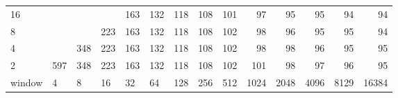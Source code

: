 \begin{table}[h]
{\begin{tabular}{lrrrrrrrrrrrrr}
			\multicolumn{1}{|l|}{16} &  &  &  & \cellcolor[HTML]{99E600}163 & \cellcolor[HTML]{99E600}132 & \cellcolor[HTML]{99E600}118 & \cellcolor[HTML]{99E600}108 & \cellcolor[HTML]{99E600}101 & \cellcolor[HTML]{99E600}97 & \cellcolor[HTML]{99E600}95 & \cellcolor[HTML]{99E600}95 & \cellcolor[HTML]{99E600}94 & \cellcolor[HTML]{99E600}94 \\ \cline{1-1}
			\multicolumn{1}{|l|}{8} &  &  & \cellcolor[HTML]{E69900}223 & \cellcolor[HTML]{99E600}163 & \cellcolor[HTML]{99E600}132 & \cellcolor[HTML]{99E600}118 & \cellcolor[HTML]{99E600}108 & \cellcolor[HTML]{99E600}102 & \cellcolor[HTML]{99E600}98 & \cellcolor[HTML]{99E600}96 & \cellcolor[HTML]{99E600}95 & \cellcolor[HTML]{99E600}95 & \cellcolor[HTML]{99E600}94 \\ \cline{1-1}
			\multicolumn{1}{|l|}{4} &  & \cellcolor[HTML]{9900E6}348 & \cellcolor[HTML]{E69900}223 & \cellcolor[HTML]{99E600}163 & \cellcolor[HTML]{99E600}132 & \cellcolor[HTML]{99E600}118 & \cellcolor[HTML]{99E600}108 & \cellcolor[HTML]{99E600}102 & \cellcolor[HTML]{99E600}98 & \cellcolor[HTML]{99E600}98 & \cellcolor[HTML]{99E600}96 & \cellcolor[HTML]{99E600}95 & \cellcolor[HTML]{99E600}95 \\ \cline{1-1}
			\multicolumn{1}{|l|}{2} & \cellcolor[HTML]{4C00E6}597 & \cellcolor[HTML]{9900E6}348 & \cellcolor[HTML]{E69900}223 & \cellcolor[HTML]{99E600}163 & \cellcolor[HTML]{99E600}132 & \cellcolor[HTML]{99E600}118 & \cellcolor[HTML]{99E600}108 & \cellcolor[HTML]{99E600}102 & \cellcolor[HTML]{99E600}101 & \cellcolor[HTML]{99E600}98 & \cellcolor[HTML]{99E600}97 & \cellcolor[HTML]{99E600}96 & \cellcolor[HTML]{99E600}95 \\ \hline
			\multicolumn{1}{l|}{window} & \multicolumn{1}{l|}{4} & \multicolumn{1}{l|}{8} & \multicolumn{1}{l|}{16} & \multicolumn{1}{l|}{32} & \multicolumn{1}{l|}{64} & \multicolumn{1}{l|}{128} & \multicolumn{1}{l|}{256} & \multicolumn{1}{l|}{512} & \multicolumn{1}{l|}{1024} & \multicolumn{1}{l|}{2048} & \multicolumn{1}{l|}{4096} & \multicolumn{1}{l|}{8129} & \multicolumn{1}{l|}{16384} \\ \cline{2-14} 
		\end{tabular}
	}
\end{table}



